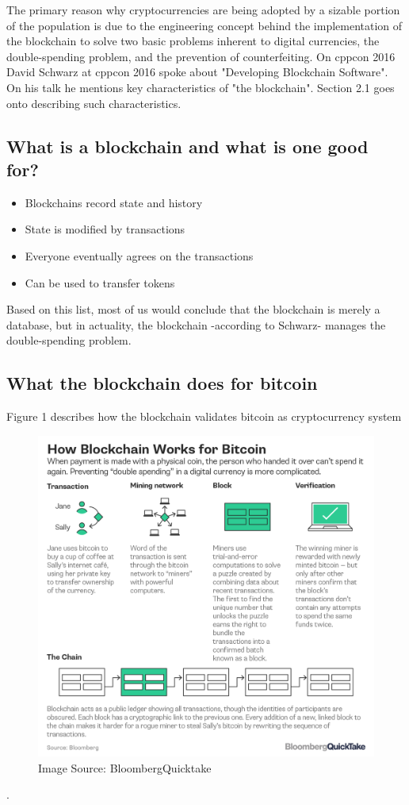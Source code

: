 \documentclass[submission,copyright,creativecommons]{eptcs}
\begin{document}
The primary reason why cryptocurrencies are being adopted by a sizable portion of the population is due to the engineering concept behind the implementation of the blockchain to solve two basic problems inherent to digital currencies, the double-spending problem, and the prevention of counterfeiting\cite{noauthor_bitcoin}.
On cppcon 2016 David Schwarz\cite{cppconCppCon2016David} at cppcon 2016 spoke about "Developing Blockchain Software".  On his talk he mentions key characteristics of "the blockchain". Section 2.1 goes onto describing such characteristics.   

\subsection{What is a blockchain and what is one good for?}
\begin{itemize}
\item Blockchains record state and history
\item State is modified by transactions
\item Everyone eventually agrees on the transactions
\item Can be used to transfer tokens
\end{itemize}

Based on this list, most of us would conclude that the blockchain is merely a database, but in actuality, the blockchain -according to Schwarz\cite{cppconCppCon2016David}- manages the double-spending problem.

\subsection{What the blockchain does for bitcoin}

Figure 1 describes how the blockchain validates bitcoin as cryptocurrency system\cite{noauthor_bitcoin}
\begin{figure}[h]
    \centering
    \label{fig:my_label}
    \includegraphics[width=5in]{bitcoin-blockchain-bloomberg}
     \caption{Image Source: BloombergQuicktake}
\end{figure}.
\end{document}
